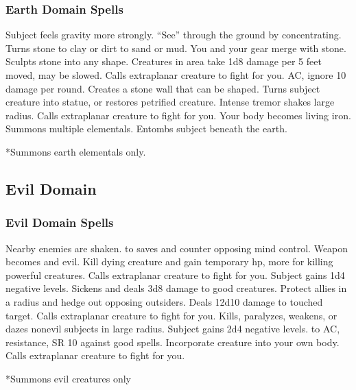 \subsubsection{Earth Domain Spells}
\begin{spelllist}
 Subject feels gravity more strongly.
 ``See'' through the ground by concentrating.
\spellhead[2]{}
 Turns stone to clay or dirt to sand or mud.
 You and your gear merge with stone.
 Sculpts stone into any shape.
 Creatures in area take 1d8 damage per 5 feet moved, may be slowed.
 Calls extraplanar creature to fight for you.
  AC, ignore 10 damage per round.
 Creates a stone wall that can be shaped.
 Turns subject creature into statue, or restores petrified creature.
 Intense tremor shakes large radius.
 Calls extraplanar creature to fight for you.
 Your body becomes living iron.
\spellhead[8]{}
 Summons multiple elementals.
 Entombs subject beneath the earth.
\end{spelllist}
*Summons earth elementals only.

\subsection{Evil Domain}

\subsubsection{Evil Domain Spells}
\begin{spelllist}
 Nearby enemies are shaken.
  to saves and counter opposing mind control.
 Weapon becomes  and evil.
 Kill dying creature and gain temporary hp, more for killing powerful creatures.
\spellhead[3]{}
\spellhead[3]{}
 Calls extraplanar creature to fight for you.
 Subject gains 1d4 negative levels.
 Sickens and deals 3d8 damage to good creatures.
\spellhead[5]{}
 Protect allies in a \areamed radius and hedge out opposing outsiders.
 Deals 12d10 damage to touched target.
 Calls extraplanar creature to fight for you.
 Kills, paralyzes, weakens, or dazes nonevil subjects in large radius.
\spellhead[7]{}
 Subject gains 2d4 negative levels.
\F {} to AC,  resistance, SR 10 against good spells.
 Incorporate creature into your own body.
 Calls extraplanar creature to fight for you.
\end{spelllist}
*Summons evil creatures only

